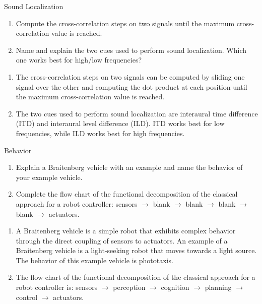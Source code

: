 \documentclass{article}
\begin{document}
\begin{exercise}{Sound Localization}
  \begin{enumerate}
    \item Compute the cross-correlation steps on two signals until the maximum cross-correlation value is reached.
    \item Name and explain the two cues used to perform sound localization. Which one works best for high/low frequencies?
  \end{enumerate}

  \begin{solution}
    \begin{enumerate}
      \item The cross-correlation steps on two signals can be computed by sliding one signal over the other and computing the dot product at each position until the maximum cross-correlation value is reached.
      \item The two cues used to perform sound localization are interaural time difference (ITD) and interaural level difference (ILD). ITD works best for low frequencies, while ILD works best for high frequencies.
    \end{enumerate}
  \end{solution}
\end{exercise}

\begin{exercise}{Behavior}
  \begin{enumerate}
    \item Explain a Braitenberg vehicle with an example and name the behavior of your example vehicle.
    \item Complete the flow chart of the functional decomposition of the classical approach for a robot controller: sensors $\rightarrow$ blank $\rightarrow$ blank $\rightarrow$ blank $\rightarrow$ blank $\rightarrow$ actuators.
  \end{enumerate}

  \begin{solution}
    \begin{enumerate}
      \item A Braitenberg vehicle is a simple robot that exhibits complex behavior through the direct coupling of sensors to actuators. An example of a Braitenberg vehicle is a light-seeking robot that moves towards a light source. The behavior of this example vehicle is phototaxis.
      \item The flow chart of the functional decomposition of the classical approach for a robot controller is: sensors $\rightarrow$ perception $\rightarrow$ cognition $\rightarrow$ planning $\rightarrow$ control $\rightarrow$ actuators.
    \end{enumerate}
  \end{solution}
\end{exercise}
\end{document}
